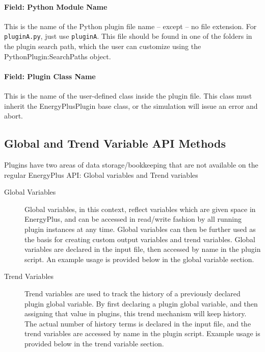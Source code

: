 \paragraph{Field: Python Module Name}

This is the name of the Python plugin file name -- except -- no file extension.
For \verb=pluginA.py=, just use \verb=pluginA=.
This file should be found in one of the folders in the plugin search path, which the user can customize using the PythonPlugin:SearchPaths object.

\paragraph{Field: Plugin Class Name}

This is the name of the user-defined class inside the plugin file.
This class must inherit the EnergyPlusPlugin base class, or the simulation will issue an error and abort.

\subsection{Global and Trend Variable API Methods}

Plugins have two areas of data storage/bookkeeping that are not available on the regular EnergyPlus API: Global variables and Trend variables

\begin{description}
    \item[Global Variables] Global variables, in this context, reflect variables which are given space in EnergyPlus, and can be accessed in read/write fashion by all running plugin instances at any time.
    Global variables can then be further used as the basis for creating custom output variables and trend variables.
    Global variables are declared in the input file, then accessed by name in the plugin script.
    An example usage is provided below in the global variable section.
    \item[Trend Variables] Trend variables are used to track the history of a previously declared plugin global variable.
    By first declaring a plugin global variable, and then assigning that value in plugins, this trend mechanism will keep history.
    The actual number of history terms is declared in the input file, and the trend variables are accessed by name in the plugin script.
    Example usage is provided below in the trend variable section.
\end{description}

